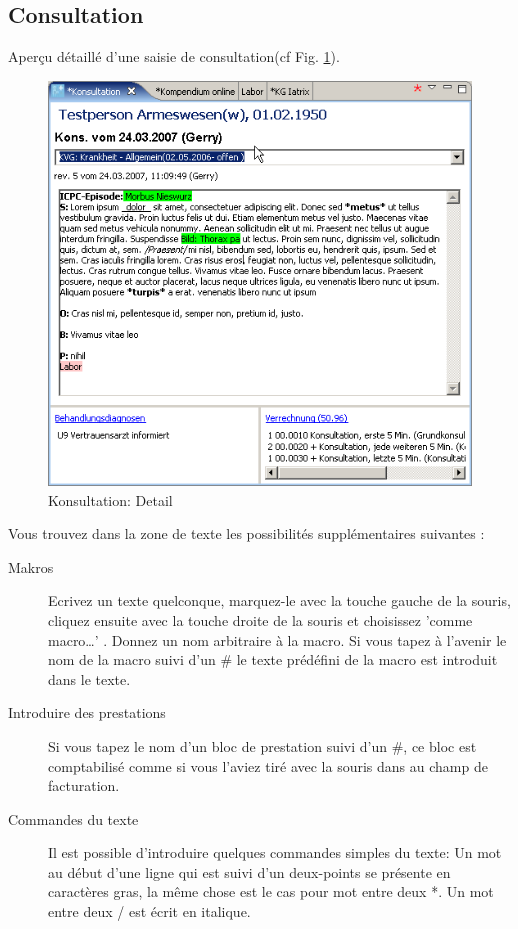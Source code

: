 \subsection{Consultation}
 \label{konsview}
Aperçu détaillé d'une saisie de consultation(cf Fig. \ref{fig:konsdetail}).
\begin{figure}[ht]
  \includegraphics{images/konsview}
  \caption{Konsultation: Detail}
  \label{fig:konsdetail}
\end{figure}

Vous trouvez dans la zone de texte les possibilités supplémentaires suivantes :
\begin{description}
\item[Makros]
Ecrivez un texte quelconque, marquez-le avec la touche gauche de la souris, cliquez ensuite avec la touche droite de la souris et choisissez  'comme macro…' . Donnez un nom arbitraire à la macro. Si vous tapez à l'avenir le nom de la macro suivi d'un \# le texte prédéfini de la macro est introduit dans le texte.

\item[Introduire des prestations]
Si vous tapez le nom d'un bloc de prestation suivi d'un \#, ce bloc est comptabilisé comme si vous l'aviez tiré avec la souris dans au champ de facturation.


\item[Commandes du texte ]
Il est possible d'introduire quelques commandes simples du texte:
Un mot au début d'une ligne qui est suivi d'un deux-points se présente en caractères gras, la même chose est le cas pour mot entre deux  *. Un mot entre deux  / est écrit en italique.
\end{description}



